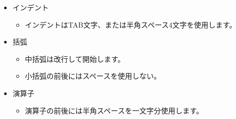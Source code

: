 \documentclass[a4j]{jarticle}
\begin{document}
\begin{itemize}
  \item インデント
  \begin{itemize}
    \item インデントはTAB文字、または半角スペース4文字を使用します。
  \end{itemize}

  \item 括弧
  \begin{itemize}
    \item 中括弧は改行して開始します。
    \item 小括弧の前後にはスペースを使用しない。
  \end{itemize}

  \item 演算子
  \begin{itemize}
    \item 演算子の前後には半角スペースを一文字分使用します。
  \end{itemize}

\end{itemize}
\end{document}
